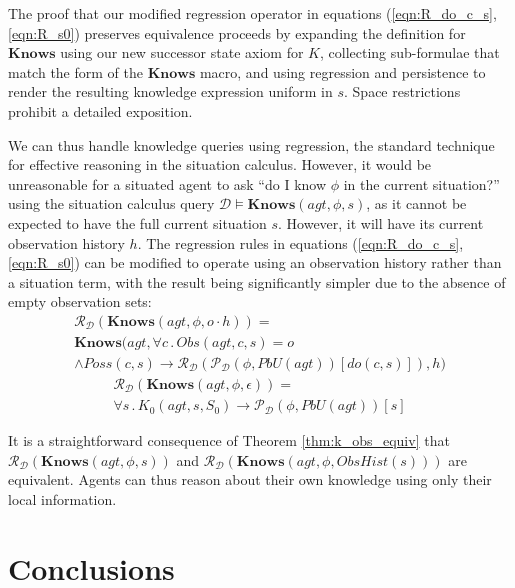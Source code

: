 \documentclass{ifaamas-submission}
\begin{document}
The proof that our modified regression
operator in equations (\ref{eqn:R_do_c_s},\ref{eqn:R_s0}) preserves
equivalence proceeds by expanding the definition for $\mathbf{Knows}$
using our new successor state axiom for $K$, collecting sub-formulae
that match the form of the $\mathbf{Knows}$ macro, and using regression
and persistence to render the resulting knowledge expression uniform
in $s$.  Space restrictions prohibit a detailed exposition.

We can thus handle knowledge queries using regression, the standard
technique for effective reasoning in the situation calculus.
However, it would be unreasonable for a situated agent to ask {}``do
I know $\phi$ in the current situation?'' using the situation calculus
query $\mathcal{D}\models\mathbf{Knows}(agt,\phi,s)$, as it cannot
be expected to have the full current situation $s$. However, it will
have its current observation history $h$.
The regression rules in equations (\ref{eqn:R_do_c_s},\ref{eqn:R_s0})
can be modified to operate using an observation history rather than a
situation term, with the result being significantly simpler due to the
absence of empty observation sets:
\begin{multline}
\mathcal{R}_{\mathcal{D}}(\mathbf{Knows}(agt,\phi,o\cdot h))=\\
\mathbf{Knows}(agt,\forall c\,.\, Obs(agt,c,s)=o\\
\wedge Poss(c,s)\rightarrow\mathcal{R}_{\mathcal{D}}(\mathcal{P}_{\mathcal{D}}(\phi,PbU(agt))[do(c,s)]),h)
\end{multline}
\begin{multline}
\mathcal{R}_{\mathcal{D}}(\mathbf{Knows}(agt,\phi,\epsilon))=\\
\forall s\,.\, K_{0}(agt,s,S_{0})\rightarrow\mathcal{P}_{\mathcal{D}}(\phi,PbU(agt))[s]
\end{multline}

It is a straightforward consequence of Theorem \ref{thm:k_obs_equiv}
that $\mathcal{R}_{\mathcal{D}}(\mathbf{Knows}(agt,\phi,s))$  and
$\mathcal{R}_{\mathcal{D}}(\mathbf{Knows}(agt,\phi,ObsHist(s)))$
are equivalent.
Agents can thus reason about their own knowledge
using only their local information.

\section{Conclusions}
\end{document}
